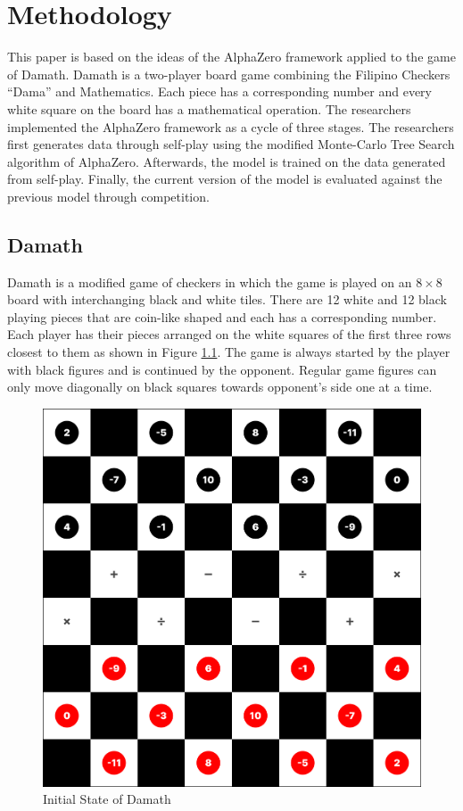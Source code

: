\chapter{Methodology}

This paper is based on the ideas of the AlphaZero framework applied to the game of Damath. Damath is a two-player board game combining the Filipino Checkers ``Dama'' and Mathematics. Each piece has a corresponding number and every  white square on the board has a mathematical operation. The researchers implemented the AlphaZero framework as a cycle of three stages. The researchers first generates data through self-play using the modified Monte-Carlo Tree Search algorithm of AlphaZero. Afterwards, the model is trained on the data generated from self-play. Finally, the current version of the model is evaluated against the previous model through competition.

\section{Damath}

Damath is a modified game of checkers in which the game is played on an $8 \times 8$ board with interchanging black and white tiles. There are 12 white and 12 black playing pieces that are coin-like shaped and each has a corresponding number. Each player has their pieces arranged on the white squares of the first three rows closest to them as shown in Figure \ref{fig:initial_state}. The game is always started by the player with black figures and is continued by the opponent. Regular game figures can only move diagonally on black squares towards opponent's side one at a time.

\begin{figure}[htb]
    \centering
    \includegraphics[width=0.5\linewidth]{images/initial_state.png}
    \caption{Initial State of Damath}
    \label{fig:initial_state}
\end{figure}

